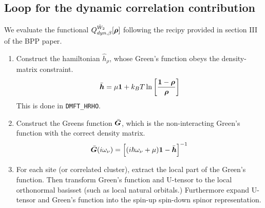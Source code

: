 \documentclass[11pt,a4paper]{report}
\begin{document}
\subsection{Loop for the dynamic correlation contribution}
We evaluate the functional $Q^{\hat{W}_2}_{dyn,\beta}[\bm{\rho}]$
following the recipy provided in section III of the BPP
paper\cite{bloechl13_prb88_25139}.
\begin{enumerate}
\item Construct the hamiltonian $\hat{h}_\rho$, whose Green's function
  obeys the density-matrix constraint.
\begin{eqnarray}
\bar{\bm{h}}=\mu\bm{1}
+k_BT\ln\left[\frac{\bm{1}-\bm{\rho}}{\bm{\rho}}\right]
\end{eqnarray}
This is done in \verb|DMFT_HRHO|.
%
\item Construct the Greens function $\bar{\bm{G}}$, which is the
  non-interacting Green's function with the correct density matrix.
\begin{eqnarray}
\bar{\bm{G}}(i\omega_\nu)=\Bigl[(i\hbar\omega_\nu+\mu)\bm{1}-\bar{\bm{h}}
\Bigr]^{-1}
\end{eqnarray}
%
\item For each site (or correlated cluster), extract the local part of
  the Green's function. Then transform Green's function and U-tensor
  to the local orthonormal basisset (such as local natural orbitals.)
  Furthermore expand U-tensor and Green's function into the spin-up
  spin-down spinor representation.


\end{enumerate}
\end{document}
